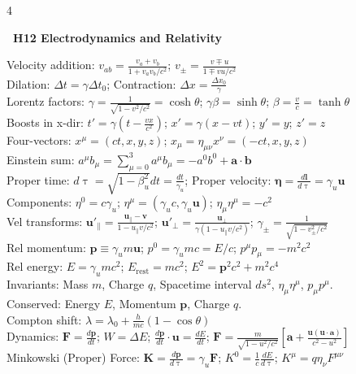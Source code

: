 \documentclass[a4paper,twoside]{article}
\newcommand{\secblock}[1]{%
\par\vspace{1.5pt}%
\noindent\colorbox{hdrcol}{\parbox[c][0.95em][c]{0.99\linewidth}{\color{white}\bfseries\scriptsize \ #1}}\par
\vspace{0.8pt}%
}
\begin{document}
\begin{multicols*}{4}
\secblock{H12 Electrodynamics and Relativity}
Velocity addition: \(v_{ab} = \frac{v_a + v_b}{1 + v_a v_b/c^2}\); \quad $v_\pm = \frac{v \mp u}{1 \mp vu/c^2}$ \\
Dilation: \(\Delta t = \gamma \Delta t_0\); \quad Contraction: \(\Delta x = \frac{\Delta x_0}{\gamma}\) \\
Lorentz factors: \(\gamma = \frac{1}{\sqrt{1 - v^2/c^2}} = \cosh\theta\); \quad \(\gamma\beta = \sinh\theta\); \quad \(\beta = \frac{v}{c} = \tanh\theta\) \\
Boosts in x-dir: \(t' = \gamma (t - \frac{v x}{c^2})\); \quad \(x' = \gamma (x - vt)\); \quad \(y'=y\); \quad \(z'=z\) \\
Four-vectors: \(x^\mu = (ct, x, y, z)\); \quad $x_\mu = \eta_{\mu\nu}x^\nu = (-ct, x, y, z)$ \\
Einstein sum: \(a^\mu b_\mu = \sum_{\mu=0}^3 a^\mu b_\mu = -a^0b^0 + \bm a \cdot \bm b\) \\
Proper time: \(d\uptau = \sqrt{1 - \beta_u^2}dt = \frac{dt}{\gamma_u}\); \quad Proper velocity: \(\bm \eta = \frac{d\bm l}{d\uptau} = \gamma_u \bm u\) \\
Components: \(\eta^0 = c\gamma_u\); \quad \(\eta^\mu = (\gamma_u c, \gamma_u \bm u)\); \quad \(\eta_\mu \eta^\mu = -c^2\) \\
Vel transforms: \(\bm u'_\parallel = \frac{\bm u_\parallel-\bm v}{1 - u_\parallel v/c^2}\); \quad \(\bm u'_\perp = \frac{\bm u_\perp}{\gamma (1 - u_\parallel v/c^2)}\); \quad $\gamma_{\pm} = \frac{1}{\sqrt{1-v_{\pm}^2/c^2}}$ \\
Rel momentum: \(\bm p \equiv \gamma_u m \bm u\); \quad \(p^0 = \gamma_u mc = E/c\); \quad \(p^\mu p_\mu = -m^2c^2\) \\
Rel energy: \(E = \gamma_u mc^2\); \quad \(E_{\text{rest}} = mc^2\); \quad \(E^2 = \bm p^2 c^2 + m^2c^4\) \\
Invariants: Mass $m$, Charge $q$, Spacetime interval $ds^2$, $\eta_\mu\eta^\mu$, $p_\mu p^\mu$. \\
Conserved: Energy $E$, Momentum $\bm p$, Charge $q$. \\
Compton shift: \(\lambda = \lambda_0 + \frac{h}{mc}(1-\cos \theta)\) \\
Dynamics: \(\bm F = \frac{d\bm p}{dt}\); \quad $W = \Delta E$; \quad \(\frac{d\bm p}{dt} \cdot \bm u = \frac{dE}{dt}\); \quad \(\bm F = \frac{m}{\sqrt{1-u^2/c^2}}[\bm a + \frac{\bm u (\bm u \cdot \bm a)}{c^2-u^2}]\) \\
Minkowski (Proper) Force: \(\bm K = \frac{d\bm p}{d\uptau} = \gamma_u \bm F\); \quad \(K^0 = \frac{1}{c}\frac{dE}{d\uptau}\); \quad $K^\mu = q \eta_\nu F^{\mu\nu}$ \\

\end{multicols*}
\end{document}
